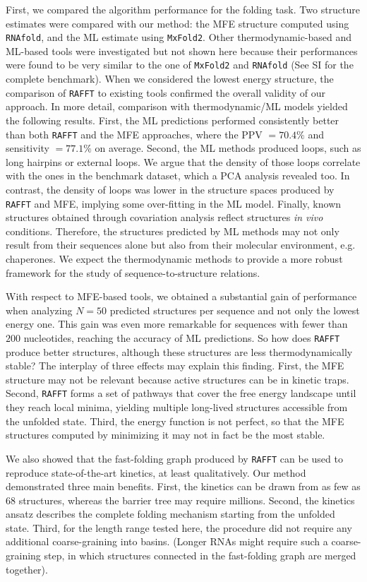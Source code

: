 First, we compared the algorithm performance for the folding task. Two structure estimates were compared with our method: the MFE structure computed using \texttt{RNAfold}, and the ML estimate using \texttt{MxFold2}. Other thermodynamic-based and ML-based tools were investigated but not shown here because their performances were found to be very similar to the one of \texttt{MxFold2} and \texttt{RNAfold} (See SI for the complete benchmark). When we considered the lowest energy structure, the comparison of \texttt{RAFFT} to existing tools confirmed the overall validity of our approach. In more detail, comparison with thermodynamic/ML models yielded the following results. First, the ML predictions performed consistently better than both \texttt{RAFFT} and the MFE approaches, where the PPV $=70.4\%$ and sensitivity $=77.1\%$ on average. Second, the ML methods produced loops, such as long hairpins or external loops. We argue that the density of those loops correlate with the ones in the benchmark dataset, which a PCA analysis revealed too. In contrast, the density of loops was lower in the structure spaces produced by \texttt{RAFFT} and MFE, implying some over-fitting in the ML model. Finally, known structures obtained through covariation analysis reflect structures \textit{in vivo} conditions. Therefore, the structures predicted by ML methods may not only result from their sequences alone but also from their molecular environment, e.g. chaperones. We expect the thermodynamic methods to provide a more robust framework for the study of sequence-to-structure relations.

With respect to MFE-based tools, we obtained a substantial gain of performance when analyzing \(N=50\) predicted structures per sequence and not only the lowest energy one. This gain was even more remarkable for sequences with fewer than $200$ nucleotides, reaching the accuracy of ML predictions. So how does \texttt{RAFFT} produce better structures, although these structures are less thermodynamically stable? The interplay of three effects may explain this finding. First, the MFE structure may not be relevant because active structures can be in kinetic traps. Second, \texttt{RAFFT} forms a set of pathways that cover the free energy landscape until they reach local minima, yielding multiple long-lived structures accessible from the unfolded state. Third, the energy function is not perfect, so that the MFE structures computed by minimizing it may not in fact be the most stable. 

We also showed that the fast-folding graph produced by \texttt{RAFFT} can be used to reproduce state-of-the-art kinetics, at least qualitatively. Our method demonstrated three main benefits. First, the kinetics can be drawn from as few as $68$ structures, whereas the barrier tree may require millions. Second, the kinetics ansatz describes the complete folding mechanism starting from the unfolded state. Third, for the length range tested here, the procedure did not require any additional coarse-graining into basins. (Longer RNAs might require such a coarse-graining step, in which structures connected in the fast-folding graph are merged together).

